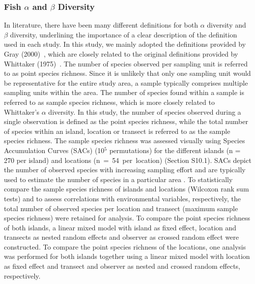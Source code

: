 \documentclass[jmse,article,accept,moreauthors,pdftex]{Definitions/mdpi}
\begin{document}
\subsubsection{Fish $\alpha$ and $\beta$ Diversity}
\label{sect:div}
 
In literature, there have been many different definitions for both $\alpha$ diversity and $\beta$ diversity, underlining the importance of a clear description of the definition used in each study. In this study, we mainly adopted the definitions provided by Gray \mbox{(2000) \citep{Gray2000TheShelf}}, which are closely related to the original definitions provided by Whittaker \mbox{(1975) \citep{Whittaker1975CommunitiesEcosystems}.} The number of species observed per sampling unit is referred to as point species richness. Since it is unlikely that only one sampling unit would be representative for the entire study area, a sample typically comprises multiple sampling units within the area. The number of species found within a sample is referred to as sample species richness, which is more closely related to Whittaker's $\alpha$ diversity. In this study, the number of species observed during a single observation is defined as the point species richness, while the total number of species within an island, location or transect is referred to as the sample species richness. The sample species richness was assessed visually using Species Accumulation Curves (SACs) (10$^{5}$ permutations) for the different islands (n = 270 per island) and locations \mbox{(n = 54 per location)} (Section S10.1). %
SACs depict the number of observed species with increasing sampling effort and are typically used to estimate the number of species in a particular area \citep{Magurran}. To statistically compare the sample species richness of islands and locations (Wilcoxon rank sum tests) and to assess correlations with environmental variables, respectively, the total number of observed species per location and transect (maximum sample species richness) were retained for analysis. To compare the point species richness of both islands, a linear mixed model with island as fixed effect, location and transects as nested random effects and observer as crossed random effect were constructed. To compare the point species richness of the locations, one analysis was performed for both islands together using a linear mixed model with location as fixed effect and transect and observer as nested and crossed random effects, respectively. 
\end{document}
